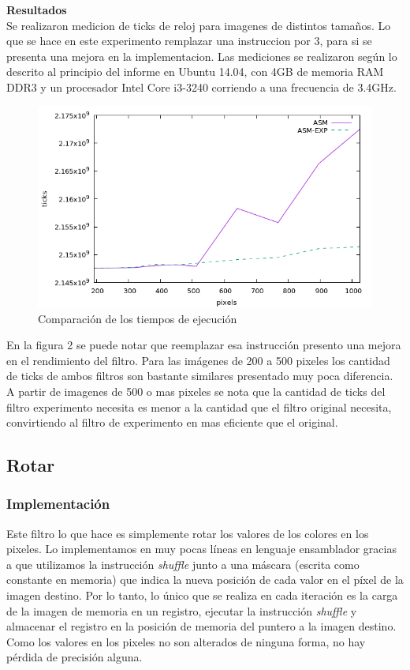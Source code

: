 \documentclass[a4paper]{article}
\begin{document}
\textbf{Resultados}
\\
Se realizaron medicion de ticks de reloj para imagenes de distintos tamaños. Lo que se hace en este experimento remplazar una instruccion por 3, para si se presenta una mejora en la implementacion. 
Las mediciones se realizaron según lo descrito al principio del informe en Ubuntu 14.04, con 4GB de memoria RAM DDR3 y un procesador Intel Core i3-3240 corriendo a una frecuencia de 3.4GHz.


\begin{figure}[H]
  \begin{center}
	\includegraphics[scale=0.77]{imagenes/smalltiles-Exp.png}
	\caption{Comparación de los tiempos de ejecución}
	\label{rotar_exp}
  \end{center}
\end{figure}

En la figura 2 se puede notar que reemplazar esa instrucción presento una mejora en el rendimiento del filtro. Para las imágenes de 200 a 500 pixeles los cantidad de  ticks de ambos filtros son bastante similares presentado muy poca diferencia. A partir de imagenes de 500 o mas pixeles se nota que la cantidad de ticks del filtro experimento necesita es menor a la cantidad que el filtro original necesita, convirtiendo al filtro de experimento en mas eficiente que el original.

\newpage
\subsection{Rotar}
\subsubsection{Implementación}
Este filtro lo que hace es simplemente rotar los valores de los colores en los pixeles. Lo implementamos en muy pocas líneas en lenguaje ensamblador gracias a que utilizamos la instrucción \textit{shuffle} junto a una máscara (escrita como constante en memoria) que indica la nueva posición de cada valor en el píxel de la imagen destino. Por lo tanto, lo único que se realiza en cada iteración es la carga de la imagen de memoria en un registro, ejecutar la instrucción \textit{shuffle} y almacenar el registro en la posición de memoria del puntero a la imagen destino. 
\\Como los valores en los pixeles no son alterados de ninguna forma, no hay pérdida de precisión alguna.\\
\end{document}
